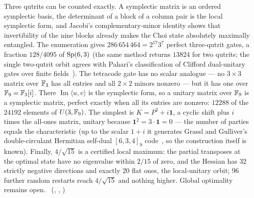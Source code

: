 Three qutrits can be counted exactly. A symplectic matrix is an ordered symplectic basis, the determinant of a block of
a column pair is the local symplectic form, and Jacobi's complementary-minor identity shows that invertibility of the
nine blocks already makes the Choi state absolutely maximally entangled. The enumeration gives
$286\,654\,464=2^{17}3^7$ perfect three-qutrit gates, a fraction $128/4095$ of $\mathrm{Sp}(6,3)$ (the same method returns
$13824$ for two qutrits; the single two-qutrit orbit agrees with Pahari's classification of Clifford dual-unitary gates
over finite fields~\cite{Pahari2026}). The tetracode gate has no scalar analogue --- no $3\times3$ matrix over $\mathbb{F}_3$ has
all entries and all $2\times2$ minors nonzero --- but it has one over $\mathbb{F}_9=\mathbb{F}_3[i]$. There $\operatorname{Im}\langle
u,v\rangle$ is the symplectic form, so a unitary matrix over $\mathbb{F}_9$ is a symplectic matrix, perfect exactly when all its
entries are nonzero: $12288$ of the $24192$ elements of $U(3,\mathbb{F}_9)$. The simplest is $K=P^2+i\mathbf 1$, a cyclic shift
plus $i$ times the all-ones matrix, unitary because $\mathbf 1^2=3\cdot\mathbf 1=0$ --- the number of parties equals the
characteristic (up to the scalar $1+i$ it generates Grassl and Gulliver's double-circulant Hermitian self-dual
$[6,3,4]_9$ code~\cite{GrasslGulliver2009,GrasslRoetteler2015}, so the construction itself is known). Finally,
$4/\sqrt{15}$ is a certified local maximum: the partial transposes at the optimal state have no
eigenvalue within $2/15$ of zero, and the Hessian has $32$ strictly negative directions and exactly $20$ flat ones, the
local-unitary orbit; $96$ further random restarts reach $4/\sqrt{15}$ and nothing higher. Global optimality remains open.
\tierC\ (, ,
)

